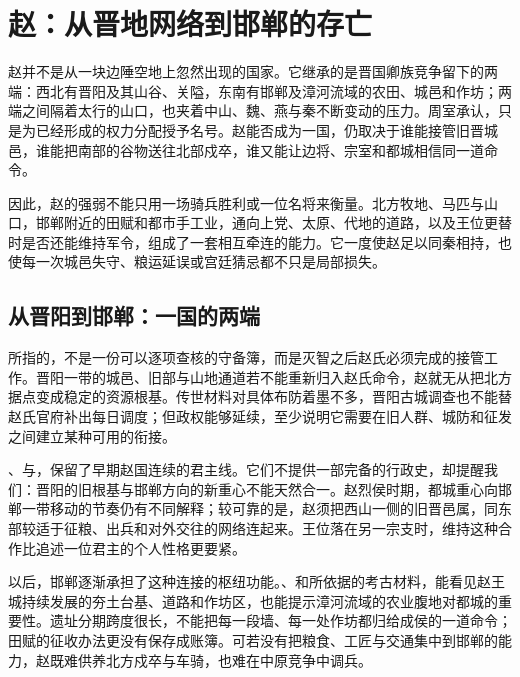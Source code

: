\section{赵：从晋地网络到邯郸的存亡}

赵并不是从一块边陲空地上忽然出现的国家。它继承的是晋国卿族竞争留下的两端：西北有晋阳及其山谷、关隘，东南有邯郸及漳河流域的农田、城邑和作坊；两端之间隔着太行的山口，也夹着中山、魏、燕与秦不断变动的压力。周室承认，只是为已经形成的权力分配授予名号。赵能否成为一国，仍取决于谁能接管旧晋城邑，谁能把南部的谷物送往北部戍卒，谁又能让边将、宗室和都城相信同一道命令。

因此，赵的强弱不能只用一场骑兵胜利或一位名将来衡量。北方牧地、马匹与山口，邯郸附近的田赋和都市手工业，通向上党、太原、代地的道路，以及王位更替时是否还能维持军令，组成了一套相互牵连的能力。它一度使赵足以同秦相持，也使每一次城邑失守、粮运延误或宫廷猜忌都不只是局部损失。

\subsection{从晋阳到邯郸：一国的两端}

所指的，不是一份可以逐项查核的守备簿，而是灭智之后赵氏必须完成的接管工作。晋阳一带的城邑、旧部与山地通道若不能重新归入赵氏命令，赵就无从把北方据点变成稳定的资源根基。传世材料对具体布防着墨不多，晋阳古城调查也不能替赵氏官府补出每日调度；但政权能够延续，至少说明它需要在旧人群、城防和征发之间建立某种可用的衔接。

、与，保留了早期赵国连续的君主线。它们不提供一部完备的行政史，却提醒我们：晋阳的旧根基与邯郸方向的新重心不能天然合一。赵烈侯时期，都城重心向邯郸一带移动的节奏仍有不同解释；较可靠的是，赵须把西山一侧的旧晋邑属，同东部较适于征粮、出兵和对外交往的网络连起来。王位落在另一宗支时，维持这种合作比追述一位君主的个人性格更要紧。

以后，邯郸逐渐承担了这种连接的枢纽功能。、和所依据的考古材料，能看见赵王城持续发展的夯土台基、道路和作坊区，也能提示漳河流域的农业腹地对都城的重要性。遗址分期跨度很长，不能把每一段墙、每一处作坊都归给成侯的一道命令；田赋的征收办法更没有保存成账簿。可若没有把粮食、工匠与交通集中到邯郸的能力，赵既难供养北方戍卒与车骑，也难在中原竞争中调兵。

